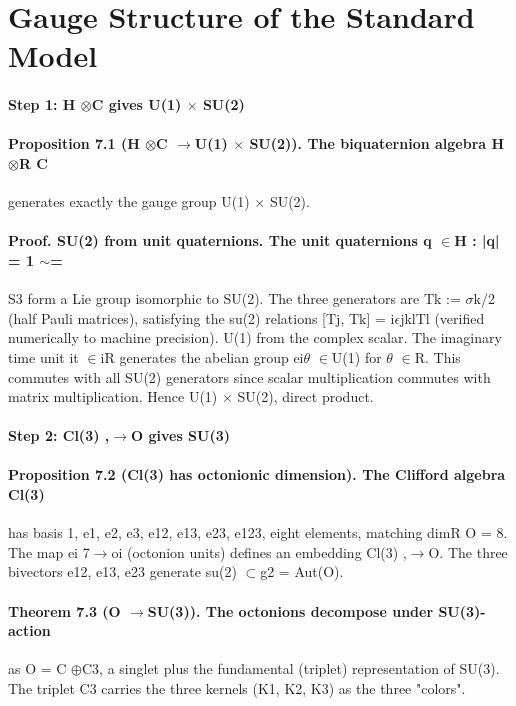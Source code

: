 \documentclass[12pt,a4paper]{article}
\begin{document}
\section{Gauge Structure of the Standard Model}
\paragraph*{Step 1: H $\otimes$C gives U(1) $\times$ SU(2)}
\paragraph*{Proposition 7.1 (H $\otimes$C $\to$U(1) $\times$ SU(2)). The biquaternion algebra H $\otimes$R C}
generates exactly the gauge group U(1) $\times$ SU(2).
\paragraph*{Proof. SU(2) from unit quaternions. The unit quaternions {q $\in$H : |q| = 1} $\sim$=}
S3 form a Lie group isomorphic to SU(2). The three generators are Tk := $\sigma$k/2 (half Pauli matrices), satisfying the su(2) relations [Tj, Tk] = i$\epsilon$jklTl (verified numerically to machine precision). U(1) from the complex scalar. The imaginary time unit it $\in$iR generates the abelian group ei$\theta$ $\in$U(1) for $\theta$ $\in$R. This commutes with all SU(2) generators since scalar multiplication commutes with matrix multiplication. Hence U(1) $\times$ SU(2), direct product.
\paragraph*{Step 2: Cl(3) ,$\to$O gives SU(3)}
\paragraph*{Proposition 7.2 (Cl(3) has octonionic dimension). The Clifford algebra Cl(3)}
has basis {1, e1, e2, e3, e12, e13, e23, e123}, eight elements, matching dimR O = 8. The map ei 7$\to$oi (octonion units) defines an embedding Cl(3) ,$\to$O. The three bivectors e12, e13, e23 generate su(2) $\subset$g2 = Aut(O).
\paragraph*{Theorem 7.3 (O $\to$SU(3)). The octonions decompose under SU(3)-action}
as O = C $\oplus$C3,
a singlet plus the fundamental (triplet) representation of SU(3). The triplet C3 carries the three kernels (K1, K2, K3) as the three "colors".
\end{document}

